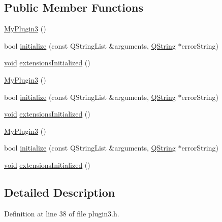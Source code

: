 \subsection*{Public Member Functions}
\begin{DoxyCompactItemize}
\item 
\hyperlink{class_plugin3_1_1_my_plugin3_a212ca8165573e34ff18cdc6de824d8a9}{My\-Plugin3} ()
\item 
bool \hyperlink{class_plugin3_1_1_my_plugin3_adccf646390950e6541ccc0a626c49394}{initialize} (const Q\-String\-List \&arguments, \hyperlink{group___u_a_v_objects_plugin_gab9d252f49c333c94a72f97ce3105a32d}{Q\-String} $\ast$error\-String)
\item 
\hyperlink{group___u_a_v_objects_plugin_ga444cf2ff3f0ecbe028adce838d373f5c}{void} \hyperlink{class_plugin3_1_1_my_plugin3_a23ad78659a9ca692f5fcdeebaa5a6ffb}{extensions\-Initialized} ()
\item 
\hyperlink{class_plugin3_1_1_my_plugin3_a62a15a56cf2c5d5fc69dc58d340adce4}{My\-Plugin3} ()
\item 
bool \hyperlink{class_plugin3_1_1_my_plugin3_a0cb093f6917e25c3f7df1578a2620ef9}{initialize} (const Q\-String\-List \&arguments, \hyperlink{group___u_a_v_objects_plugin_gab9d252f49c333c94a72f97ce3105a32d}{Q\-String} $\ast$error\-String)
\item 
\hyperlink{group___u_a_v_objects_plugin_ga444cf2ff3f0ecbe028adce838d373f5c}{void} \hyperlink{class_plugin3_1_1_my_plugin3_a44cb56ba99bb1aadd5f6d30825dd6f5a}{extensions\-Initialized} ()
\item 
\hyperlink{class_plugin3_1_1_my_plugin3_a62a15a56cf2c5d5fc69dc58d340adce4}{My\-Plugin3} ()
\item 
bool \hyperlink{class_plugin3_1_1_my_plugin3_a0cb093f6917e25c3f7df1578a2620ef9}{initialize} (const Q\-String\-List \&arguments, \hyperlink{group___u_a_v_objects_plugin_gab9d252f49c333c94a72f97ce3105a32d}{Q\-String} $\ast$error\-String)
\item 
\hyperlink{group___u_a_v_objects_plugin_ga444cf2ff3f0ecbe028adce838d373f5c}{void} \hyperlink{class_plugin3_1_1_my_plugin3_a44cb56ba99bb1aadd5f6d30825dd6f5a}{extensions\-Initialized} ()
\end{DoxyCompactItemize}


\subsection{Detailed Description}


Definition at line 38 of file plugin3.\-h.



